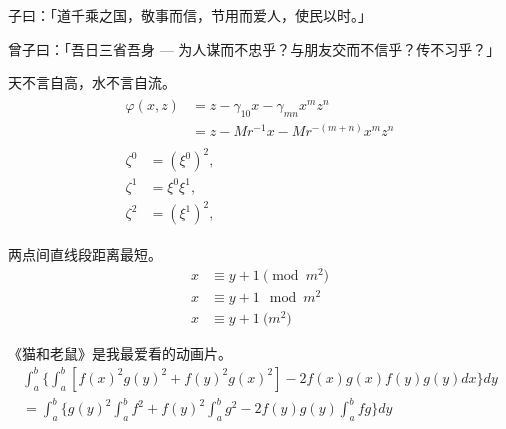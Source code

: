 \begin{definition}
    \label{thm-definition-example}
    子曰：「道千乘之国，敬事而信，节用而爱人，使民以时。」
\end{definition}

\begin{proposition}
    \label{thm-proposition-example}
    曾子曰：「吾日三省吾身 --- 为人谋而不忠乎？与朋友交而不信乎？传不习乎？」
\end{proposition}

\begin{remark}
    \label{thm-remark-example}
    天不言自高，水不言自流。
    \begin{gather*}
        \begin{split}
            \varphi(x,z)
            & = z-\gamma_{10}x-\gamma_{mn}x^mz^n\\
            & = z-Mr^{-1}x-Mr^{-(m+n)}x^mz^n
        \end{split} \\[6pt]
        \begin{align}
            \zeta^0 & = (\xi^0)^2,\\
            \zeta^1 & = \xi^0\xi^1,\\
            \zeta^2 & = (\xi^1)^2,
        \end{align}
    \end{gather*}
\end{remark}

\begin{axiom}
    \label{thm-axiom-example}
    两点间直线段距离最短。
    \begin{align}
        x & \equiv y+1\pmod{m^2}\\
        x & \equiv y+1\mod{m^2}\\
        x & \equiv y+1\pod{m^2}
    \end{align}
\end{axiom}

\begin{lemma}
    \label{thm-lemma-example}
    《猫和老鼠》是我最爱看的动画片。
    \begin{multline*}%
        \int_a^b\biggl\{\int_a^b[f(x)^2g(y)^2+f(y)^2g(x)^2]
        -2f(x)g(x)f(y)g(y)dx\biggr\}dy \\
        =\int_a^b\biggl\{g(y)^2\int_a^bf^2
        +f(y)^2\int_a^bg^2-2f(y)g(y)\int_a^b fg\biggr\}dy
    \end{multline*}
\end{lemma}

